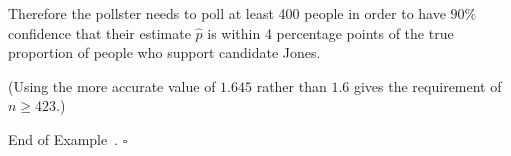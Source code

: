 \documentclass[10pt]{article}
\theoremstyle{definition}
\newtheorem{example}[theorem]{Example}
\renewenvironment{example}
{\begin{oldexample}}
  {\par\smallskip\hfill   End of Example~\theexample. $\square$    \par\end{oldexample}}
\newcommand{\1}[1]{\textbf{1}_{\left[#1\right]}} %
\def\P{\mathbb{P}} %
\def\Var{\mathrm{Var}} %
\begin{document}
\begin{example}
  Therefore the pollster needs to poll at least 400 people in order to have
  $90\%$ confidence that their estimate $\widehat{p}$ is within 4 percentage
  points of the true proportion of people who support candidate Jones.

  (Using the more accurate value of $1.645$ rather than $1.6$ gives the
  requirement of $n \geq 423$.)

  
  




\end{example}
\end{document}

